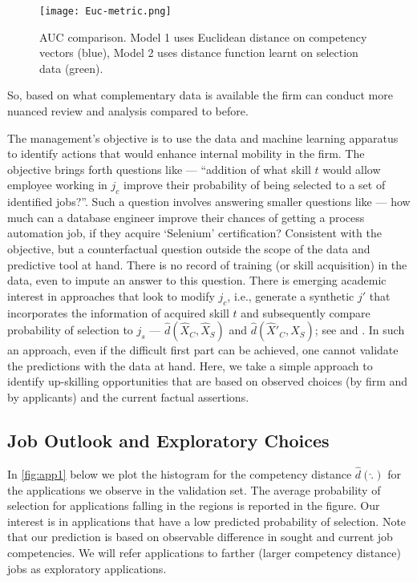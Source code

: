 \documentclass{article}
\begin{document}
\begin{figure}[!ht]
    \centering
    \texttt{[image: Euc-metric.png]} %
    \caption{AUC comparison. Model 1 uses Euclidean distance on competency vectors (blue), Model 2 uses distance function learnt on selection data (green).} %
    \label{fig:euc-metr} 
\end{figure}



So, based on what complementary data is available the firm can conduct more nuanced review and analysis compared to before.

The management's objective is to use the data and machine learning apparatus to identify actions that would enhance internal mobility in the firm. The objective brings forth questions like --- ``addition of what skill \(t\) would allow employee working in \(j_c\) improve their probability of being selected to a set of identified jobs?''. Such a question involves answering smaller questions like --- how much can a database engineer improve their chances of getting a process automation job, if they acquire `Selenium' certification? Consistent with the objective, but a counterfactual question outside the scope of the data and predictive tool at hand. There is no record of training (or skill acquisition) in the data, even to impute an answer to this question. There is emerging academic interest in approaches that look to modify \(j_c\), i.e., generate a synthetic \(j'\) that incorporates the information of acquired skill \(t\) and subsequently compare probability of selection to \(j_s\) --- \(\hat{d}(\hat{X}_C, \hat{X}_S)\) and \(\hat{d}(\hat{X}'_C, \hat{X}_S)\); see \autocite{Bana2021} and \autocite{Sisodia2022}. In such an approach, even if the difficult first part can be achieved, one cannot validate the predictions with the data at hand. Here, we take a simple approach to identify up-skilling opportunities that are based on observed choices (by firm and by applicants) and the current factual assertions.

\subsection*{Job Outlook and Exploratory Choices}


In \autoref{fig:app1} below we plot the histogram for the competency distance $\hat{d}(\hat{.})$ for the applications we observe in the validation set. The average probability of selection for applications falling in the regions is reported in the figure. Our interest is in applications that have a low predicted probability of selection. Note that our prediction is based on observable difference in sought and current job competencies. We will refer applications to farther (larger competency distance) jobs as exploratory applications. 
\end{document}
